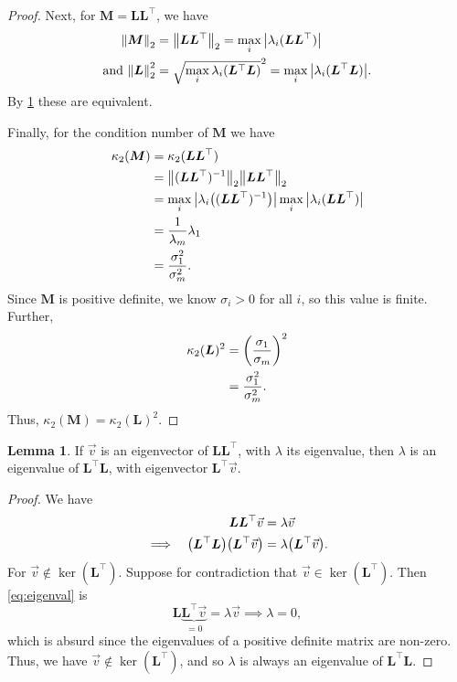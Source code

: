 \documentclass{article}
\theoremstyle{definition}
\newcommand{\mat}[1]{\bm{#1}}
\newtheorem{lemma}{Lemma}
\begin{document}
\begin{enumerate}[leftmargin=\labelsep]
\begin{proof}
				Next, for \(\mat{M} = \mat{L}\mat{L}^\top\), we have 
				\begin{align*}
					\norm{\mat{M}}_2 & = \norm{\mat{L}\mat{L}^\top}_2 = \max_i \abs{ \lambda_i(\mat{L}\mat{L}^\top) } \\
					\text{and }\norm{\mat{L}}_2^2 &= \sqrt{\max_i\lambda_i(\mat{L}^\top\mat{L})}^2 = \max_i \abs{ \lambda_i(\mat{L}^\top\mat{L}) }.
				\end{align*}
				By \cref{lem:eigenvalsLLT} these are equivalent.

				Finally, for the condition number of \(\mat{M}\) we have
				\begin{align*}
					\kappa_2(\mat{M}) & = \kappa_2(\mat{L}\mat{L}^\top) \\
					                  & = \norm{(\mat{L}\mat{L}^\top)^{-1}}_2 \norm{\mat{L}\mat{L}^\top}_2 \\
									  & = \max_i \abs{ \lambda_i\qty((\mat{L}\mat{L}^\top)^{-1} )} \max_i \abs{ \lambda_i(\mat{L}\mat{L}^\top) } \\
									  & = \frac{1}{\lambda_m} \lambda_1 \\
									  & = \frac{\sigma_1^2}{\sigma_m^2}.
				\end{align*}
				Since \(\mat{M}\) is positive definite, we know \(\sigma_i>0\) for all \(i\), so this value is finite. Further,
				\begin{align*}
					\kappa_2(\mat{L})^2 & = \qty(\frac{\sigma_1}{\sigma_m})^2 \\
					                    & = \frac{\sigma_1^2}{\sigma_m^2}.
				\end{align*}
				Thus, \(\kappa_2(\mat{M}) = \kappa_2(\mat{L})^2\).
	      \end{proof}

		  \begin{lemma}\label{lem:eigenvalsLLT}
			If \(\vec{v}\) is an eigenvector of \(\mat{L}\mat{L}^\top\), with \(\lambda\) its eigenvalue, then \(\lambda\) is an eigenvalue of \(\mat{L}^\top\mat{L}\), with eigenvector \(\mat{L}^\top \vec{v}\).
		  \end{lemma}
		  \begin{proof}
			We have 
			\begin{alignat}{4}
				         && \mat{L}\mat{L}^\top \vec{v} & = \lambda \vec{v} \label{eq:eigenval}\\
				\implies && \qty(\mat{L}^\top\mat{L}) \qty(\mat{L}^\top \vec{v}) & = \lambda \qty(\mat{L}^\top\vec{v}).\nonumber
			\end{alignat}
			For \(\vec{v}\not\in\ker(\mat{L}^\top)\). Suppose for contradiction that \(\vec{v}\in\ker(\mat{L}^\top)\). Then \cref{eq:eigenval} is 
			\[
				\mat{L}\underbrace{\mat{L}^\top \vec{v}}_{=0} = \lambda \vec{v} \implies \lambda = 0,	
			\]
			which is absurd since the eigenvalues of a positive definite matrix are non-zero. Thus, we have \(\vec{v}\not\in\ker(\mat{L}^\top)\), and so \(\lambda\) is always an eigenvalue of \(\mat{L}^\top\mat{L}\).
		  \end{proof}


\end{enumerate}
\end{document}
